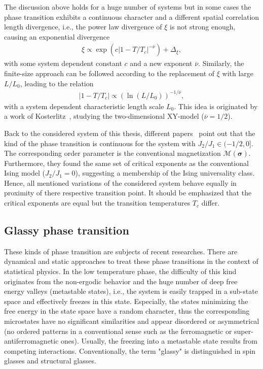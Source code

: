The discussion above holds for a huge number of systems but in some cases the phase transition exhibits a continuous character and a different spatial
correlation length divergence, i.e., the power law divergence of $\xi$ is not strong enough, causing an exponential divergence
\begin{align*}
    \xi \propto \exp\left(c\left| 1-T/T_c \right|^{-\overline{\nu}}\right) + \Delta_\xi,
\end{align*}
with some system dependent constant $c$ and a new exponent $\overline{\nu}$. Similarly, the finite-size approach can be followed according to the replacement 
of $\xi$ with large $L/L_0$, leading to the relation
\begin{align}
    \left|1-T/T_c\right| \propto \left( \ln\left(L/L_0\right)\right)^{-1/\overline{\nu}},
    \label{align:FSS_exponential}
\end{align}
with a system dependent characteristic length scale $L_0$. This idea is originated by a work of Kosterlitz~\cite{Kosterlitz1974}, studying the 
two-dimensional XY-model ($\overline{\nu}=1/2$).

Back to the considered system of this thesis, different papers~\cite{Kalz2008,Landau1980,Li2021} point out that the kind of the phase transition is 
continuous for the system with $J_2/J_1\!\in\!(-1/2,0]$. The corresponding order parameter is the conventional magnetization $\mathcal{M}(\bm{\sigma})$. 
Furthermore, they found the same set of critical exponents as the conventional Ising model ($J_2/J_1=0$), suggesting
a membership of the Ising universality class. Hence, all mentioned variations of the considered system behave equally in proximity of there 
respective transition point. It should be emphasized that the critical exponents are equal but the transition temperatures $T_c$ differ. 





\subsection*{Glassy phase transition}

These kinds of phase transition are subjects of recent researches. There are dynamical and static approaches to treat these phase transitions in the context 
of statistical physics. In the low temperature phase, the difficulty of this kind originates from the non-ergodic behavior and the huge number of deep free 
energy valleys (metastable states), i.e., the system is easily trapped in a sub-state space and effectively freezes in this state. 
Especially, the states minimizing the free energy in the state space have a random character, thus the corresponding microstates have no significant 
similarities and appear disordered or asymmetrical (no ordered patterns in a conventional sense such as the ferromagnetic or super-antiferromagnetic ones). 
Usually, the freezing into a metastable state results from competing interactions. Conventionally, the term 
"glassy" is distinguished in spin glasses and structural glasses.~\cite{Binder1986,Mezard2000}

